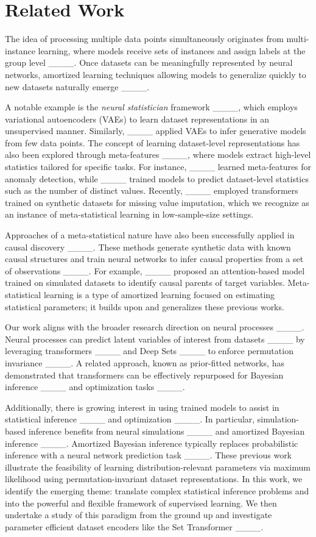 \section{Related Work}
The idea of processing multiple data points simultaneously originates from multi-instance learning, where models receive sets of instances and assign labels at the group level ____. Once datasets can be meaningfully represented by neural networks, amortized learning techniques allowing models to generalize quickly to new datasets naturally emerge ____.

A notable example is the \textit{neural statistician} framework ____, which employs variational autoencoders (VAEs) to learn dataset representations in an unsupervised manner. Similarly, ____ applied VAEs to infer generative models from few data points. The concept of learning dataset-level representations has also been explored through meta-features ____, where models extract high-level statistics tailored for specific tasks. For instance, ____ learned meta-features for anomaly detection, while ____ trained models to predict dataset-level statistics such as the number of distinct values. Recently, ____ employed transformers trained on synthetic datasets for missing value imputation, which we recognize as an instance of meta-statistical learning in low-sample-size settings.

Approaches of a meta-statistical nature have also been successfully applied in causal discovery ____. These methods generate synthetic data with known causal structures and train neural networks to infer causal properties from a set of observations ____. For example, ____ proposed an attention-based model trained on simulated datasets to identify causal parents of target variables. Meta-statistical learning is a type of amortized learning focused on estimating statistical parameters; it builds upon and generalizes these previous works. 

Our work aligns with the broader research direction on neural processes ____. Neural processes can predict latent variables of interest from datasets ____ by leveraging transformers ____ and Deep Sets ____ to enforce permutation invariance ____. A related approach, known as prior-fitted networks, has demonstrated that transformers can be effectively repurposed for Bayesian inference ____ and optimization tasks ____.

Additionally, there is growing interest in using trained models to assist in statistical inference ____ and optimization ____. In particular, simulation-based inference benefits from neural simulations ____ and amortized Bayesian inference ____. Amortized Bayesian inference typically replaces probabilistic inference with a neural network prediction task ____. These previous work illustrate the feasibility of learning distribution-relevant parameters via maximum likelihood using permutation-invariant dataset representations. In this work, we identify the emerging theme: translate complex statistical inference problems and into the powerful and flexible framework of supervised learning. We then undertake a study of this paradigm from the ground up and investigate parameter efficient dataset encoders like the Set Transformer ____.

